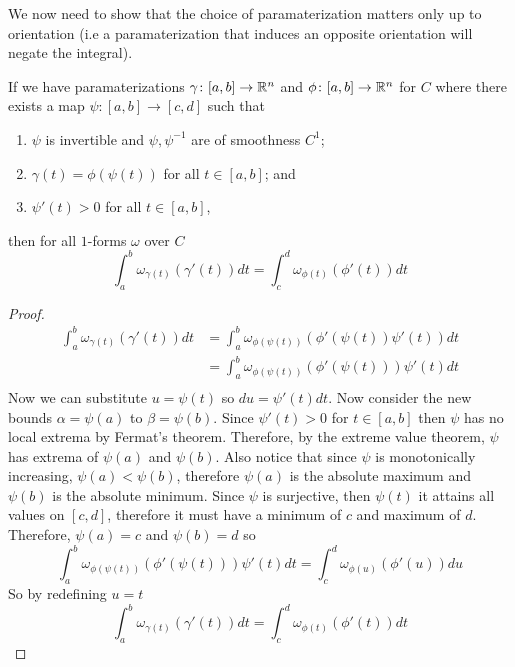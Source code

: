 \documentclass[notes.tex]{subfiles}
\begin{document}
We now need to show that the choice of paramaterization matters only up to orientation (i.e a paramaterization that induces an opposite orientation will negate the integral).
\begin{theorem} \label{integral_uniqueness_up_to_orientation_one_form}
    If we have paramaterizations $\gamma\colon [a, b] \to \mathbb{R}^n$ and $\phi\colon [a, b] \to \mathbb{R}^n$ for $C$ where there exists a map $\psi\colon[a, b] \to [c, d]$ such that
    \begin{enumerate}[label = \arabic*)]
        \item $\psi$ is invertible and $\psi, \psi^{-1}$ are of smoothness $C^1$;
        \item $\gamma(t) = \phi(\psi(t))$ for all $t \in [a, b]$; and
        \item $\psi'(t) > 0$ for all $t \in [a, b]$,
    \end{enumerate}
    then for all $1$-forms $\omega$ over $C$
    \[
        \int_a^b \omega_{\gamma(t)}(\gamma'(t))dt = \int_c^d \omega_{\phi(t)}(\phi'(t))dt
    \]
\end{theorem}
\begin{proof}
    \begin{align*}
        \int_a^b \omega_{\gamma(t)}(\gamma'(t))dt
        &= \int_a^b \omega_{\phi(\psi(t))}(\phi'(\psi(t))\psi'(t))dt \\
        &= \int_a^b \omega_{\phi(\psi(t))}(\phi'(\psi(t)))\psi'(t)dt \\
    \end{align*}
    Now we can substitute $u = \psi(t)$ so $du = \psi'(t)dt$. Now consider the new bounds $\alpha = \psi(a)$ to $\beta = \psi(b)$. Since $\psi'(t) > 0$ for $t \in [a, b]$ then $\psi$ has no local extrema by Fermat's theorem. Therefore, by the extreme value theorem, $\psi$ has extrema of $\psi(a)$ and $\psi(b)$. Also notice that since $\psi$ is monotonically increasing, $\psi(a) < \psi(b)$, therefore $\psi(a)$ is the absolute maximum and $\psi(b)$ is the absolute minimum. Since $\psi$ is surjective, then $\psi(t)$ it attains all values on $[c, d]$, therefore it must have a minimum of $c$ and maximum of $d$. Therefore, $\psi(a) = c$ and $\psi(b) = d$ so
    \[
        \int_a^b \omega_{\phi(\psi(t))}(\phi'(\psi(t)))\psi'(t)dt
        = \int_c^d \omega_{\phi(u)}(\phi'(u))du
    \]
    So by redefining $u = t$
    \[
        \int_a^b \omega_{\gamma(t)}(\gamma'(t))dt = \int_c^d \omega_{\phi(t)}(\phi'(t))dt
    \]
\end{proof}
\end{document}
